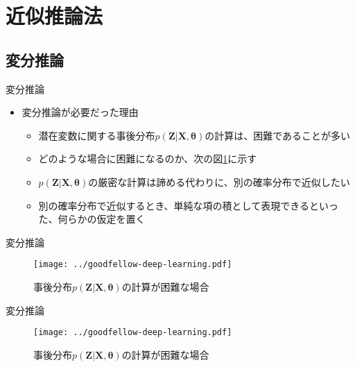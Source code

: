 \documentclass[dvipdfmx,notheorems,t]{beamer}
\begin{document}
\section{近似推論法}

\subsection{変分推論}

\begin{frame}{変分推論}

\begin{itemize}
	\item 変分推論が必要だった理由
	\begin{itemize}
		\item 潜在変数に関する事後分布$p(\bm{Z} | \bm{X}, \bm{\theta})$の計算は、困難であることが多い
		\item どのような場合に困難になるのか、次の図\ref{fig:example-of-inference-problems}に示す
		\newline
		\item $p(\bm{Z} | \bm{X}, \bm{\theta})$の厳密な計算は諦める代わりに、\alert{別の確率分布で近似}したい
		\newline
		\item 別の確率分布で近似するとき、単純な項の積として表現できるといった、\alert{何らかの仮定を置く}
	\end{itemize}
\end{itemize}

\end{frame}

\begin{frame}{変分推論}

\begin{figure}[h]
	\centering
	\texttt{[image: ../goodfellow-deep-learning.pdf]}
	\caption{事後分布$p(\bm{Z} | \bm{X}, \bm{\theta})$の計算が困難な場合}
	\label{fig:example-of-inference-problems}
\end{figure}

\end{frame}

\begin{frame}{変分推論}

\begin{figure}[h]
	\centering
	\texttt{[image: ../goodfellow-deep-learning.pdf]}
	\caption{事後分布$p(\bm{Z} | \bm{X}, \bm{\theta})$の計算が困難な場合}
	\label{fig:example-of-inference-problems-2}
\end{figure}

\end{frame}
\end{document}
